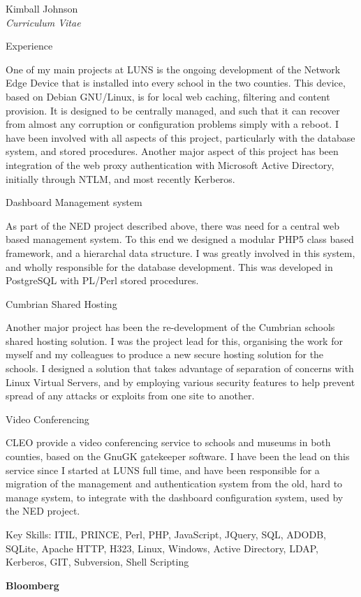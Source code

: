 \documentclass[10pt]{article}
\newenvironment{subbulletlist}{%
	\begin{list}{\labelitemii}{%
		\setlength{\topsep}{\itemsep}\setlength{\parskip}{\parsep}%
	}%
}%
{ \end{list} }
\begin{document}
\begin{cv}{Kimball Johnson\\{\large \itshape Curriculum Vitae}}
\begin{cvlist}{Experience}
\begin{subbulletlist}
        One of my main projects at LUNS is the ongoing development of the
        Network Edge Device that is installed into every school in the two
        counties.  This device, based on Debian GNU/Linux, is for local 
        web caching, filtering and content provision.  It is designed to 
        be centrally managed, and such that it can recover from almost any
        corruption or configuration problems simply with a reboot. I have 
        been involved with all aspects of this project, particularly with the 
        database system, and stored procedures. Another major aspect of this 
        project has been integration of the web proxy authentication with
        Microsoft Active Directory, initially through NTLM, and most recently
        Kerberos. 
    \item Dashboard Management system

		As part of the NED project described above, there was need for a central 
		web based management system.  To this end we designed a modular PHP5 class 
		based framework, and a hierarchal data structure. I was greatly involved 
		in this system, and wholly responsible for the database development. This was 
		developed in PostgreSQL with PL/Perl stored procedures.
    \item Cumbrian Shared Hosting 

        Another major project has been the re-development of the Cumbrian
        schools shared hosting solution.  I was the project lead for this,
        organising the work for myself and my colleagues to produce a new 
        secure hosting solution for the schools.  I designed a 
        solution that takes advantage of separation of concerns with Linux 
        Virtual Servers, and by employing various security features to help
        prevent spread of any attacks or exploits from one site to another.
    \item Video Conferencing 

        CLEO provide a video conferencing service to schools and museums in
        both counties, based on the GnuGK gatekeeper software.  I have
        been the lead on this service since I started at LUNS full time, and
        have been responsible for a migration of the management and
        authentication system from the old, hard to manage system, to integrate
        with the dashboard configuration system, used by the NED project.
	\end{subbulletlist}
	
	Key Skills: ITIL, PRINCE, Perl, PHP, JavaScript, JQuery,  SQL, ADODB, SQLite,
	Apache HTTP, H323, Linux, Windows, Active Directory, LDAP, Kerberos, GIT, 
	Subversion, Shell Scripting
	\item \textbf{Bloomberg}


\end{cvlist}
\end{cv}
\end{document}
